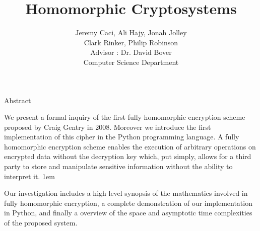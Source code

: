 \documentclass[a0,portrait]{a0poster}
\title{Homomorphic Cryptosystems}
\author{
Jeremy Caci, Ali Hajy, Jonah Jolley\\
Clark Rinker, Philip Robinson\\
Advisor : Dr. David Bover\\
Computer Science Department
}
\begin{document}
\maketitle

\def\fh{{\em Fully Homomorphic}\xspace}

\begin{multicols}{2}
\begin{slide}{Abstract}

We present a formal inquiry of the first fully homomorphic encryption scheme proposed by Craig Gentry in 2008. Moreover we introduce the first implementation of this cipher in the Python programming language. A fully homomorphic encryption scheme enables the execution of arbitrary operations on encrypted data without the decryption key which, put simply, allows for a third party to  store and manipulate sensitive information without the ability to interpret it. 
\parskip 1em

Our investigation includes a high level synopsis of the mathematics involved in fully homomorphic encryption, a complete demonstration of our implementation in Python, and finally a overview of the space and asymptotic time complexities of the proposed system. 

\end{slide}

\end{multicols}
\end{document}

